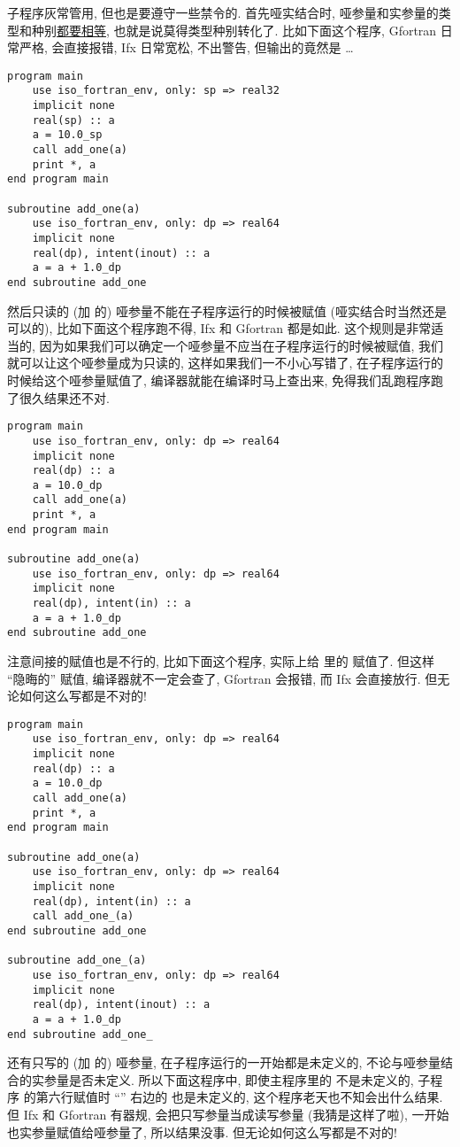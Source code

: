 子程序灰常管用, 但也是要遵守一些禁令的. 首先哑实结合时, 哑参量和实参量的类型和种别\uline{都要相等}, 也就是说莫得类型种别转化了. 比如下面这个程序, Gfortran 日常严格, 会直接报错, Ifx 日常宽松, 不出警告, 但输出的竟然是 \dots{}
\begin{lstlisting} 
program main
    use iso_fortran_env, only: sp => real32
    implicit none
    real(sp) :: a
    a = 10.0_sp
    call add_one(a)
    print *, a
end program main

subroutine add_one(a)
    use iso_fortran_env, only: dp => real64
    implicit none
    real(dp), intent(inout) :: a
    a = a + 1.0_dp
end subroutine add_one
\end{lstlisting} 
然后只读的 (加  的) 哑参量不能在子程序运行的时候被赋值 (哑实结合时当然还是可以的), 比如下面这个程序跑不得, Ifx 和 Gfortran 都是如此. 这个规则是非常适当的, 因为如果我们可以确定一个哑参量不应当在子程序运行的时候被赋值, 我们就可以让这个哑参量成为只读的, 这样如果我们一不小心写错了, 在子程序运行的时候给这个哑参量赋值了, 编译器就能在编译时马上查出来, 免得我们乱跑程序跑了很久结果还不对. 
\begin{lstlisting} 
program main
    use iso_fortran_env, only: dp => real64
    implicit none
    real(dp) :: a
    a = 10.0_dp
    call add_one(a)
    print *, a
end program main

subroutine add_one(a)
    use iso_fortran_env, only: dp => real64
    implicit none
    real(dp), intent(in) :: a
    a = a + 1.0_dp
end subroutine add_one
\end{lstlisting} 
注意间接的赋值也是不行的, 比如下面这个程序,  实际上给  里的  赋值了. 但这样 ``隐晦的'' 赋值, 编译器就不一定会查了, Gfortran 会报错, 而 Ifx 会直接放行. 但无论如何这么写都是不对的!\label{secret_assignment} 
\begin{lstlisting} 
program main
    use iso_fortran_env, only: dp => real64
    implicit none
    real(dp) :: a
    a = 10.0_dp
    call add_one(a)
    print *, a
end program main

subroutine add_one(a)
    use iso_fortran_env, only: dp => real64
    implicit none
    real(dp), intent(in) :: a
    call add_one_(a)
end subroutine add_one

subroutine add_one_(a)
    use iso_fortran_env, only: dp => real64
    implicit none
    real(dp), intent(inout) :: a
    a = a + 1.0_dp
end subroutine add_one_
\end{lstlisting} 
还有只写的 (加  的) 哑参量, 在子程序运行的一开始都是未定义的, 不论与哑参量结合的实参量是否未定义. 所以下面这程序中, 即使主程序里的  不是未定义的, 子程序  的第六行赋值时 ``\ttt{=}'' 右边的  也是未定义的, 这个程序老天也不知会出什么结果. 但 Ifx 和 Gfortran 有器规, 会把只写参量当成读写参量 (我猜是这样了啦), 一开始也实参量赋值给哑参量了, 所以结果没事. 但无论如何这么写都是不对的!
